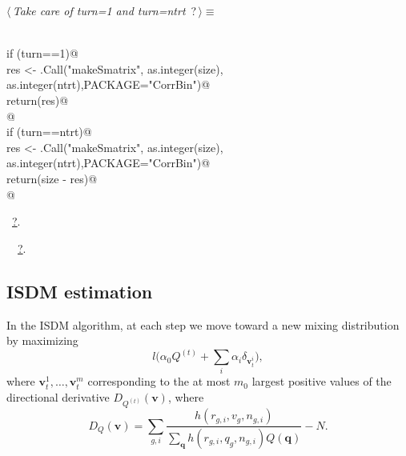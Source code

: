 \documentclass[reqno]{amsart}
\renewcommand{\NWtarget}[2]{\hypertarget{#1}{#2}}
\renewcommand{\NWlink}[2]{\hyperlink{#1}{#2}}
\newcommand{\bv}{\mathbf{v}}
\newcommand{\bq}{\mathbf{q}}
\begin{document}
\begin{flushleft} \small
\begin{minipage}{\linewidth}\label{scrap20}\raggedright\small
\NWtarget{nuweb?}{} $\langle\,${\itshape Take care of turn=1 and turn=ntrt}\nobreak\ {\footnotesize {?}}$\,\rangle\equiv$
\vspace{-1ex}
\begin{list}{}{} \item
\mbox{}\verb@@\\
\mbox{}\verb@  if (turn==1){@\\
\mbox{}\verb@     res <- .Call("makeSmatrix", as.integer(size), as.integer(ntrt),PACKAGE="CorrBin")@\\
\mbox{}\verb@     return(res)@\\
\mbox{}\verb@  }@\\
\mbox{}\verb@  if (turn==ntrt){@\\
\mbox{}\verb@     res <- .Call("makeSmatrix", as.integer(size), as.integer(ntrt),PACKAGE="CorrBin")@\\
\mbox{}\verb@     return(size - res)@\\
\mbox{}\verb@  }@\\
\mbox{}\verb@@{\NWsep}
\end{list}
\vspace{-1.5ex}
\footnotesize
\begin{list}{}{\setlength{\itemsep}{-\parsep}\setlength{\itemindent}{-\leftmargin}}
\item \NWtxtMacroRefIn\ \NWlink{nuweb?}{?}.
\item \NWtxtIdentsUsed\nobreak\  \verb@makeSmatrix@\nobreak\ \NWlink{nuweb?}{?}.
\item{}
\end{list}
\end{minipage}\vspace{4ex}
\end{flushleft}
\subsection{ISDM estimation}

In the ISDM algorithm, at each step we move toward a new mixing distribution
by maximizing
\begin{equation}
l\big(\alpha_0Q^{(t)}+\sum_{i}\alpha_i\delta_{\bv^i_t}\big),
\end{equation}
where $\bv^1_t, \ldots, \bv^m_t$ corresponding to the at
most $m_0$ largest positive values of the directional derivative 
$D_{Q^{(t)}}(\bv)$, where
\begin{equation}\label{E:D}
D_Q(\bv ) = \sum_{g,i}\frac{h(r_{g,i},v_g,n_{g,i})}{\sum_\bq
h(r_{g,i},q_g,n_{g,i})Q(\bq)}-N.
\end{equation}
\end{document}
